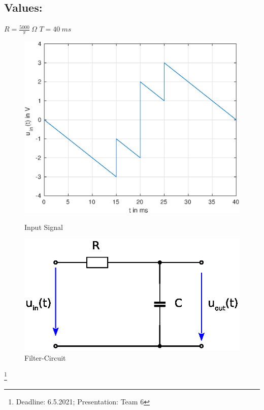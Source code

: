 \documentclass[a4paper]{article}
\newcommand\blfootnote[1]{%
	\begingroup
	\renewcommand\thefootnote{}\footnote{#1}%
	\addtocounter{footnote}{-1}%
	\endgroup
}
\begin{document}
	\subsection*{Values:}
	$R = \frac{5000}{\pi}~\Omega$ \qquad $T = 40~ms$\\
\begin{figure}[!htb]
\begin{minipage}{0.55\textwidth}
	\centering
	\includegraphics[width=1\textwidth]{./Figures/inputsignal.eps}
	\caption{Input Signal}
	\label{fig:input}
\end{minipage}\hfill
\begin{minipage}{0.39\textwidth}
	\centering
	\includegraphics[width=1\textwidth]{./Figures/filter.eps}
	\caption{Filter-Circuit}
	\label{fig:filter}
\end{minipage}
\end{figure}
	\blfootnote{Deadline: 6.5.2021; Presentation: Team 6}
\end{document}
